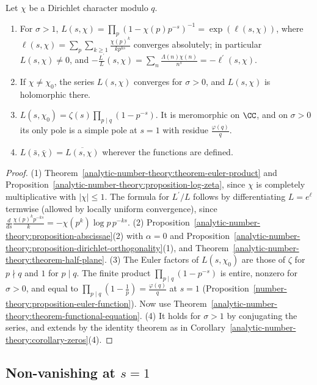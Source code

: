 \begin{proposition}\label{analytic-number-theory:proposition-l-basic}
Let $\chi$ be a Dirichlet character modulo $q$.
\begin{enumerate}
\item For $\sigma > 1$, $L(s, \chi) = \prod_p(1 - \chi(p)p^{-s})^{-1} = \exp(\ell(s, \chi))$, where $\ell(s, \chi) = \sum_p\sum_{k \geq 1}\frac{\chi(p)^k}{kp^{ks}}$ converges absolutely; in particular $L(s, \chi) \neq 0$,
and $-\frac{L^{\prime}}{L}(s, \chi) = \sum_n\frac{\Lambda(n)\chi(n)}{n^s} = -\ell^{\prime}(s, \chi)$.
\item If $\chi \neq \chi_0$, the series $L(s, \chi)$ converges for $\sigma > 0$, and $L(s, \chi)$ is holomorphic there.
\item $L(s, \chi_0) = \zeta(s)\prod_{p \mid q}(1 - p^{-s})$. It is meromorphic on $\CC$, and on $\sigma > 0$ its only pole is a simple pole at $s = 1$ with residue $\frac{\varphi(q)}{q}$.
\item $L(\bar s, \bar\chi) = \overline{L(s, \chi)}$ wherever the functions are defined.
\end{enumerate}
\end{proposition}

\begin{proof}
(1) Theorem~\ref{analytic-number-theory:theorem-euler-product} and Proposition~\ref{analytic-number-theory:proposition-log-zeta}, since $\chi$ is completely multiplicative with $|\chi| \leq 1$. The
formula for $L^{\prime}/L$ follows by differentiating $L = e^\ell$ termwise (allowed by locally uniform convergence), since $\frac{d}{ds}\frac{\chi(p)^kp^{-ks}}{k} = -\chi(p^k)\log p\,p^{-ks}$.
(2) Proposition~\ref{analytic-number-theory:proposition-abscissae}(2) with $\alpha = 0$ and Proposition~\ref{analytic-number-theory:proposition-dirichlet-orthogonality}(1), and
Theorem~\ref{analytic-number-theory:theorem-half-plane}.
(3) The Euler factors of $L(s, \chi_0)$ are those of $\zeta$ for $p \nmid q$ and $1$ for $p \mid q$. The finite product $\prod_{p \mid q}(1 - p^{-s})$ is entire, nonzero for $\sigma > 0$, and equal to
$\prod_{p \mid q}(1 - \frac1p) = \frac{\varphi(q)}{q}$ at $s = 1$ (Proposition~\ref{number-theory:proposition-euler-function}). Now use Theorem~\ref{analytic-number-theory:theorem-functional-equation}.
(4) It holds for $\sigma > 1$ by conjugating the series, and extends by the identity theorem as in Corollary~\ref{analytic-number-theory:corollary-zeros}(4).
\end{proof}

\subsection{Non-vanishing at $s = 1$}\label{analytic-number-theory:subsection-l-one}

